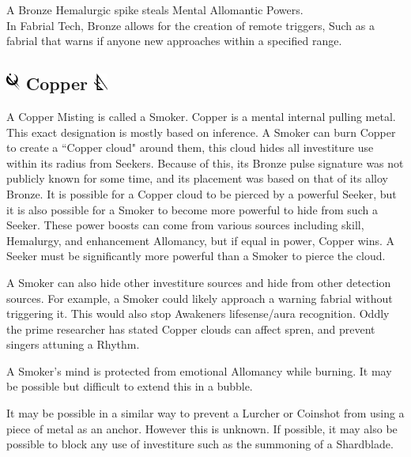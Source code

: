\documentclass[conference]{IEEEtran}
\begin{document}
A Bronze Hemalurgic spike steals Mental Allomantic Powers.\cite{HE-TB}\\

In Fabrial Tech, Bronze allows for the creation of remote triggers,\cite{RoW-E8}  Such as a fabrial that warns if anyone new approaches within a specified range.\cite{WoR-I4}
\subsection*{\includegraphics[height=1em]{images/Copper.png}  Copper \includegraphics[height=1em]{images/Copper_(Feruchemy).png}}
A Copper Misting is called a Smoker.\cite{ARS}  Copper is a mental internal pulling metal.\cite{AL-TB}  This exact designation is mostly based on inference.  A Smoker can burn Copper to create a ``Copper cloud" around them, this cloud hides all investiture use within its radius from Seekers.\cite{ARS}  Because of this, its Bronze pulse signature was not publicly known for some time, and its placement was based on that of its alloy Bronze.\cite{TFE-CH20}\cite{TFE-CH7}
It is possible for a Copper cloud to be pierced by a powerful Seeker,\cite{TFE-CH31} but it is also possible for a Smoker to become more powerful to hide from such a Seeker.\cite{TFE-CH31}  These power boosts can come from various sources including skill, Hemalurgy, and enhancement Allomancy, but if equal in power, Copper wins.  A Seeker must be significantly more powerful than a Smoker to pierce the cloud.\cite{TFE-CH31}

A Smoker can also hide other investiture sources and hide from other detection sources.\cite{seeker-spren}  For example, a Smoker could likely approach a warning fabrial without triggering it.  This would also stop Awakeners lifesense/aura recognition.\cite{life-block}  Oddly the prime researcher has stated Copper clouds can affect spren,\cite{copper-spren} and prevent singers attuning a Rhythm.\cite{rythm-block}

A Smoker's mind is protected from emotional Allomancy while burning.\cite{TFE-CH7}  It may be possible but difficult to extend this in a bubble.\cite{emo-cloud}

It may be possible in a similar way to prevent a Lurcher or Coinshot from using a piece of metal as an anchor.  However this is unknown.  If possible, it may also be possible to block any use of investiture such as the summoning of a Shardblade.\cite{rythm-block}\cite{emo-cloud}\cite{ARS}
\end{document}
